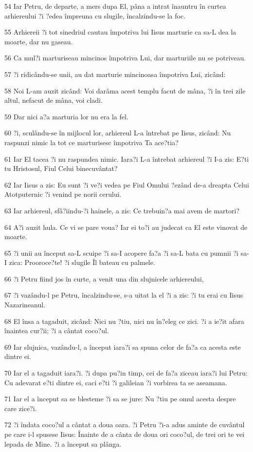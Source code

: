 \par 54 Iar Petru, de departe, a mers dupa El, pâna a intrat înauntru în curtea arhiereului ?i ?edea împreuna cu slugile, încalzindu-se la foc.
\par 55 Arhiereii ?i tot sinedriul cautau împotriva lui Iisus marturie ca sa-L dea la moarte, dar nu gaseau.
\par 56 Ca mul?i marturiseau mincinos împotriva Lui, dar marturiile nu se potriveau.
\par 57 ?i ridicându-se unii, au dat marturie mincinoasa împotriva Lui, zicând:
\par 58 Noi L-am auzit zicând: Voi darâma acest templu facut de mâna, ?i în trei zile altul, nefacut de mâna, voi cladi.
\par 59 Dar nici a?a marturia lor nu era la fel.
\par 60 ?i, sculându-se în mijlocul lor, arhiereul L-a întrebat pe Iisus, zicând: Nu raspunzi nimic la tot ce marturisesc împotriva Ta ace?tia?
\par 61 Iar El tacea ?i nu raspundea nimic. Iara?i L-a întrebat arhiereul ?i I-a zis: E?ti tu Hristosul, Fiul Celui binecuvântat?
\par 62 Iar Iisus a zis: Eu sunt ?i ve?i vedea pe Fiul Omului ?ezând de-a dreapta Celui Atotputernic ?i venind pe norii cerului.
\par 63 Iar arhiereul, sfâ?iindu-?i hainele, a zis: Ce trebuin?a mai avem de martori?
\par 64 A?i auzit hula. Ce vi se pare voua? Iar ei to?i au judecat ca El este vinovat de moarte.
\par 65 ?i unii au început sa-L scuipe ?i sa-I acopere fa?a ?i sa-L bata cu pumnii ?i sa-I zica: Prooroce?te! ?i slugile Îl bateau cu palmele.
\par 66 ?i Petru fiind jos în curte, a venit una din slujnicele arhiereului,
\par 67 ?i vazându-l pe Petru, încalzindu-se, s-a uitat la el ?i a zis: ?i tu erai cu Iisus Nazarineanul.
\par 68 El însa a tagaduit, zicând: Nici nu ?tiu, nici nu în?eleg ce zici. ?i a ie?it afara înaintea cur?ii; ?i a cântat coco?ul.
\par 69 Iar slujnica, vazându-l, a început iara?i sa spuna celor de fa?a ca acesta este dintre ei.
\par 70 Iar el a tagaduit iara?i. ?i dupa pu?in timp, cei de fa?a ziceau iara?i lui Petru: Cu adevarat e?ti dintre ei, caci e?ti ?i galileian ?i vorbirea ta se aseamana.
\par 71 Iar el a început sa se blesteme ?i sa se jure: Nu ?tiu pe omul acesta despre care zice?i.
\par 72 ?i îndata coco?ul a cântat a doua oara. ?i Petru ?i-a adus aminte de cuvântul pe care i-l spusese Iisus: Înainte de a cânta de doua ori coco?ul, de trei ori te vei lepada de Mine. ?i a început sa plânga.

